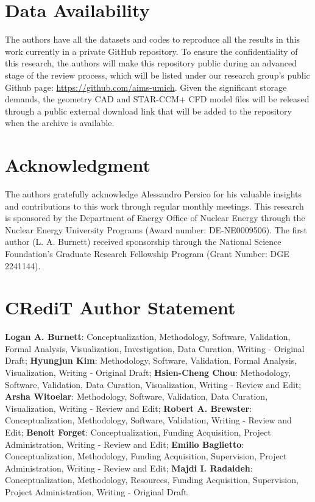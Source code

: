 \documentclass[review]{elsarticle}
\theoremstyle{definition}
\theoremstyle{definition}
\theoremstyle{remark}
\begin{document}
\section*{Data Availability}
\label{sec:avail}

The authors have all the datasets and codes to reproduce all the results in this work currently in a private GitHub repository. To ensure the confidentiality of this research, the authors will make this repository public during an advanced stage of the review process, which will be listed under our research group's public Github page: \url{https://github.com/aims-umich}. Given the significant storage demands, the geometry CAD and STAR-CCM+ CFD model files will be released through a public external download link that will be added to the repository when the archive is available.

\section*{Acknowledgment}

The authors gratefully acknowledge Alessandro Persico for his valuable insights and contributions to this work through regular monthly meetings. This research is sponsored by the Department of Energy Office of Nuclear Energy through the Nuclear Energy University Programs (Award number: DE-NE0009506). The first author (L. A. Burnett) received sponsorship through the National Science Foundation's Graduate Research Fellowship Program (Grant Number: DGE 2241144).

\section*{CRediT Author Statement}

\noindent\textbf{Logan A. Burnett}: Conceptualization, Methodology, Software, Validation, Formal Analysis, Visualization, Investigation, Data Curation, Writing - Original Draft; \textbf{Hyungjun Kim}: Methodology, Software, Validation, Formal Analysis, Visualization, Writing - Original Draft; \textbf{Hsien-Cheng Chou}: Methodology, Software, Validation, Data Curation, Visualization, Writing - Review and Edit; \textbf{Arsha Witoelar}: Methodology, Software, Validation, Data Curation, Visualization, Writing - Review and Edit; \textbf{Robert A. Brewster}: Conceptualization, Methodology, Software, Validation, Writing - Review and Edit; \textbf{Benoit Forget}: Conceptualization, Funding Acquisition, Project Administration, Writing - Review and Edit; \textbf{Emilio Baglietto}: Conceptualization, Methodology, Funding Acquisition, Supervision, Project Administration, Writing - Review and Edit; \textbf{Majdi I. Radaideh}: Conceptualization, Methodology, Resources, Funding Acquisition, Supervision, Project Administration, Writing - Original Draft.
\end{document}

